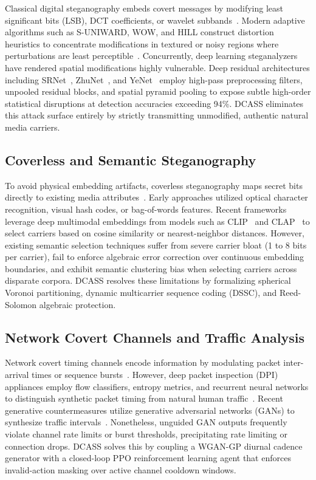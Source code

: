\documentclass[11pt,journal,onecolumn]{IEEEtran}\linespread{1.3}
\begin{document}
Classical digital steganography embeds covert messages by modifying least significant bits (LSB), DCT coefficients, or wavelet subbands~\cite{provos2003hide}. Modern adaptive algorithms such as S-UNIWARD, WOW, and HILL construct distortion heuristics to concentrate modifications in textured or noisy regions where perturbations are least perceptible~\cite{holub2014universal,holub2012designing,li2014new}. Concurrently, deep learning steganalyzers have rendered spatial modifications highly vulnerable. Deep residual architectures including SRNet~\cite{boroumand2018deep}, ZhuNet~\cite{zhang2019run}, and YeNet~\cite{ye2017deep} employ high-pass preprocessing filters, unpooled residual blocks, and spatial pyramid pooling to expose subtle high-order statistical disruptions at detection accuracies exceeding 94\%. DCASS eliminates this attack surface entirely by strictly transmitting unmodified, authentic natural media carriers.

\subsection{Coverless and Semantic Steganography}

To avoid physical embedding artifacts, coverless steganography maps secret bits directly to existing media attributes~\cite{zhou2015novel,zhang2018coverless}. Early approaches utilized optical character recognition, visual hash codes, or bag-of-words features. Recent frameworks leverage deep multimodal embeddings from models such as CLIP~\cite{radford2021learning} and CLAP~\cite{elizalde2023clap} to select carriers based on cosine similarity or nearest-neighbor distances. However, existing semantic selection techniques suffer from severe carrier bloat (1 to 8 bits per carrier), fail to enforce algebraic error correction over continuous embedding boundaries, and exhibit semantic clustering bias when selecting carriers across disparate corpora. DCASS resolves these limitations by formalizing spherical Voronoi partitioning, dynamic multicarrier sequence coding (DSSC), and Reed-Solomon algebraic protection.

\subsection{Network Covert Channels and Traffic Analysis}

Network covert timing channels encode information by modulating packet inter-arrival times or sequence bursts~\cite{cabuk2004ip,wright2006inferring}. However, deep packet inspection (DPI) appliances employ flow classifiers, entropy metrics, and recurrent neural networks to distinguish synthetic packet timing from natural human traffic~\cite{dyer2012peekaboo,wang2014seeing}. Recent generative countermeasures utilize generative adversarial networks (GANs) to synthesize traffic intervals~\cite{goodfellow2014generative}. Nonetheless, unguided GAN outputs frequently violate channel rate limits or burst thresholds, precipitating rate limiting or connection drops. DCASS solves this by coupling a WGAN-GP diurnal cadence generator with a closed-loop PPO reinforcement learning agent that enforces invalid-action masking over active channel cooldown windows.
\end{document}
